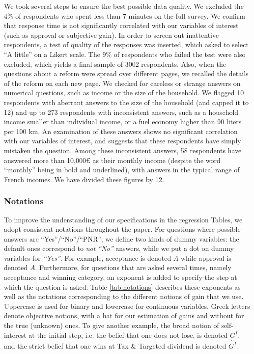 \documentclass[12pt]{article} %
\providecommand{\DIFaddtex}[1]{{\protect\color{blue}\uwave{#1}}} %
\providecommand{\DIFaddbegin}{} %
\providecommand{\DIFaddend}{} %
\providecommand{\DIFadd}[1]{\texorpdfstring{\DIFaddtex{#1}}{#1}} %
\newcommand{\DIFaddincludegraphics}[2][]{{\color{blue}\fbox{\DIFOincludegraphics[#1]{#2}}}} %
\DeclareRobustCommand{\DIFaddbegin}{\DIFOaddbegin \let\includegraphics\DIFaddincludegraphics} %
\DeclareRobustCommand{\DIFaddend}{\DIFOaddend \let\includegraphics\DIFOincludegraphics} %
\begin{document}
We took several steps to ensure the best possible data quality. We excluded the 4\% of respondents who spent less than 7 minutes on the full survey. We confirm that response time is not significantly correlated with our variables of interest (such as approval or subjective gain). In order to screen out inattentive respondents, a test of quality of the responses was inserted, which asked to select ``A little'' on a Likert scale. The 9\% of respondents who failed the test were also excluded, which yields a final sample of 3002 respondents. Also, when the questions about a reform were spread over different pages, we recalled the details of the reform on each new page. We checked for careless or strange answers on numerical questions, such as income or the size of the household. We flagged 10 respondents with aberrant answers to the size of the household (and capped it to 12) and up to 273 respondents with inconsistent answers, such as a household income smaller than individual income, or a fuel economy higher than 90 liters per 100 km. An examination of these answers shows no significant correlation with our variables of interest, and suggests that these respondents have simply mistaken the question. Among these inconsistent answers, 58 respondents have answered more than 10,000\euro{} as their monthly income (despite the word ``monthly'' being in bold and underlined), with answers in the typical range of French \DIFaddbegin \DIFadd{annual }\DIFaddend incomes. We have divided these figures by 12.

\subsubsection{Notations}

To improve the understanding of our specifications in the regression Tables, we adopt consistent notations throughout the paper. For questions where possible answers are ``Yes''/``No''/``PNR'', we define two kinds of dummy variables: the default ones correspond to \textit{not ``No''} answers, while we put a dot on dummy variables for \textit{``Yes''}. For example, acceptance is denoted $A$ while approval is denoted $\dot{A}$. Furthermore, for questions that are asked several times, namely acceptance and winning category, an exponent is added to specify the step at which the question is asked. Table \ref{tab:notations} describes these exponents as well as the notations corresponding to the different notions of gain that we use. Uppercase is used for binary and lowercase for continuous variables, Greek letters denote objective notions, with a hat for our estimation of gains and without for the true (unknown) ones. To give another example, the broad notion of self-interest at the initial step, i.e. the belief that one does not lose, is denoted $G^I$, and the strict belief that one wins at Tax \& Targeted dividend is denoted $\dot{G^T}$.
\end{document}
